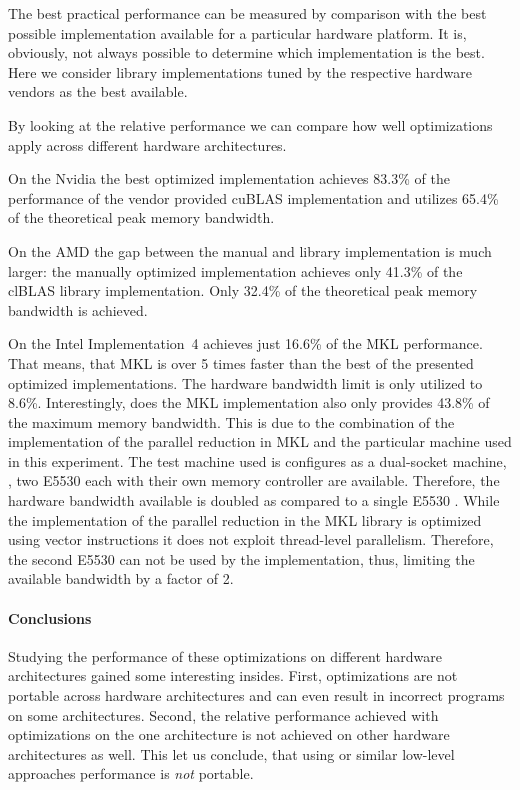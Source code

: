 The best practical performance can be measured by comparison with the best possible implementation available for a particular hardware platform.
It is, obviously, not always possible to determine which implementation is the best.
Here we consider library implementations tuned by the respective hardware vendors as the best available.

By looking at the relative performance we can compare how well optimizations apply across different hardware architectures.

On the Nvidia \GPU the best optimized implementation achieves 83.3\% of the performance of the vendor provided cuBLAS implementation and utilizes 65.4\% of the theoretical peak memory bandwidth.

On the AMD \GPU the gap between the manual and library implementation is much larger:
the manually optimized implementation achieves only 41.3\% of the clBLAS library implementation.
Only 32.4\% of the theoretical peak memory bandwidth is achieved.

On the Intel \CPU Implementation~4 achieves just 16.6\% of the MKL performance.
That means, that MKL is over 5 times faster than the best of the presented optimized implementations.
The hardware bandwidth limit is only utilized to 8.6\%.
Interestingly, does the MKL implementation also only provides 43.8\% of the maximum memory bandwidth.
This is due to the combination of the implementation of the parallel reduction in MKL and the particular machine used in this experiment.
The test machine used is configures as a dual-socket machine, \ie, two E5530 \CPUs each with their own memory controller are available.
Therefore, the hardware bandwidth available is doubled as compared to a single E5530 \CPU.
While the implementation of the parallel reduction in the MKL library is optimized using vector instructions it does not exploit thread-level parallelism.
Therefore, the second E5530 \CPU can not be used by the implementation, thus, limiting the available bandwidth by a factor of 2.

\paragraph{Conclusions}
Studying the performance of these optimizations on different hardware architectures gained some interesting insides.
First, optimizations are not portable across hardware architectures and can even result in incorrect programs on some architectures.
Second, the relative performance achieved with optimizations on the one architecture is not achieved on other hardware architectures as well.
This let us conclude, that using \OpenCL or similar low-level approaches performance is \emph{not} portable.

